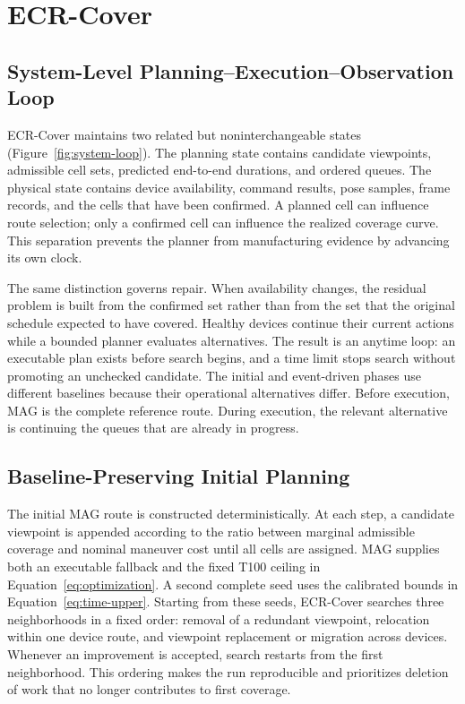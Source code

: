 \section{ECR-Cover}\label{sec:method}

\subsection{System-Level Planning--Execution--Observation Loop}

ECR-Cover maintains two related but noninterchangeable states (Figure~\ref{fig:system-loop}). The planning state contains candidate viewpoints, admissible cell sets, predicted end-to-end durations, and ordered queues. The physical state contains device availability, command results, pose samples, frame records, and the cells that have been confirmed. A planned cell can influence route selection; only a confirmed cell can influence the realized coverage curve. This separation prevents the planner from manufacturing evidence by advancing its own clock.

The same distinction governs repair. When availability changes, the residual problem is built from the confirmed set rather than from the set that the original schedule expected to have covered. Healthy devices continue their current actions while a bounded planner evaluates alternatives. The result is an anytime loop: an executable plan exists before search begins, and a time limit stops search without promoting an unchecked candidate. The initial and event-driven phases use different baselines because their operational alternatives differ. Before execution, MAG is the complete reference route. During execution, the relevant alternative is continuing the queues that are already in progress.

\subsection{Baseline-Preserving Initial Planning}

The initial MAG route is constructed deterministically. At each step, a candidate viewpoint is appended according to the ratio between marginal admissible coverage and nominal maneuver cost until all cells are assigned. MAG supplies both an executable fallback and the fixed T100 ceiling in Equation~\eqref{eq:optimization}. A second complete seed uses the calibrated bounds in Equation~\eqref{eq:time-upper}. Starting from these seeds, ECR-Cover searches three neighborhoods in a fixed order: removal of a redundant viewpoint, relocation within one device route, and viewpoint replacement or migration across devices. Whenever an improvement is accepted, search restarts from the first neighborhood. This ordering makes the run reproducible and prioritizes deletion of work that no longer contributes to first coverage.

